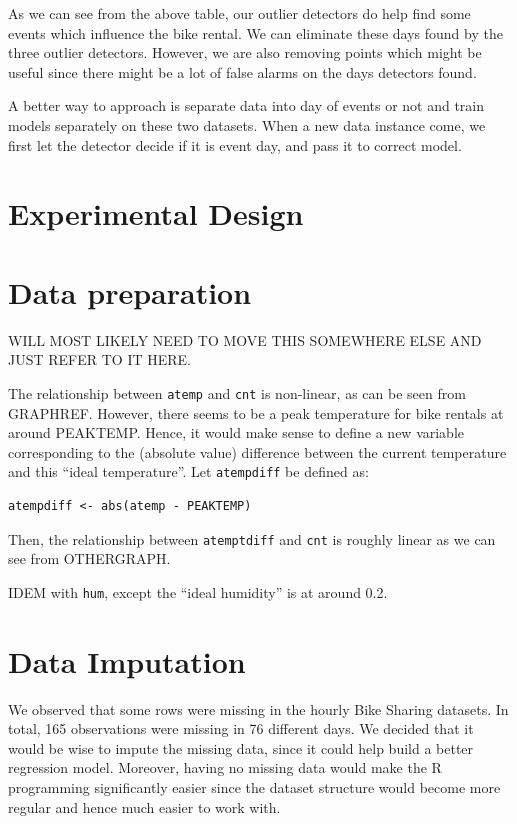 \documentclass[12pt]{article}
\begin{document}
 	As we can see from the above table, our outlier detectors do help find some events which influence the bike rental. We can eliminate these days found by the three outlier detectors. However, we are also removing points which might be useful since there might be a lot of false alarms on the days detectors found.  
 	
 	A better way to approach is separate data into day of events or not and train models separately on these two datasets. When a new data instance come, we first let the detector decide if it is event day, and pass it to correct model.
	
\section{Experimental Design}
\label{sec:experimental-design}



\section{Data preparation}
WILL MOST LIKELY NEED TO MOVE THIS SOMEWHERE ELSE AND JUST REFER TO IT HERE.

The relationship between \texttt{atemp} and \texttt{cnt} is non-linear, as can be seen from GRAPHREF. However, there seems to be a peak temperature for bike rentals at around PEAKTEMP. Hence, it would make sense to define a new variable corresponding to the (absolute value) difference between the current temperature and this ``ideal temperature''. Let \texttt{atempdiff} be defined as:
\begin{verbatim}
atempdiff <- abs(atemp - PEAKTEMP)
\end{verbatim}
Then, the relationship between \texttt{atemptdiff} and \texttt{cnt} is roughly linear as we can see from OTHERGRAPH.

IDEM with \texttt{hum}, except the ``ideal humidity'' is at around 0.2.

\section{Data Imputation}

We observed that some rows were missing in the hourly Bike Sharing datasets. In total, 165 observations were missing in 76 different days. We decided that it would be wise to impute the missing data, since it could help build a better regression model. Moreover, having no missing data would make the R programming significantly easier since the dataset structure would become more regular and hence much easier to work with.
\end{document}
